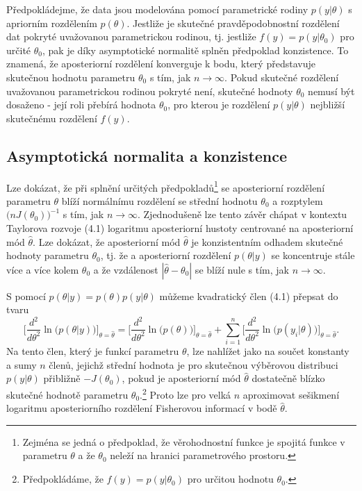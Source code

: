 Předpokládejme, že data jsou modelována pomocí parametrické rodiny $p(y|\theta)$ s apriorním rozdělením $p(\theta)$.  Jestliže je skutečné pravděpodobnostní rozdělení dat pokryté uvažovanou parametrickou rodinou, tj. jestliže $f(y) = p(y|\theta_0)$ pro určité $\theta_0$, pak je díky asymptotické normalitě splněn předpoklad konzistence. To znamená, že aposteriorní rozdělení konverguje k bodu, který představuje skutečnou hodnotu parametru $\theta_0$ s tím, jak $n \rightarrow \infty$. Pokud skutečné rozdělení uvažovanou parametrickou rodinou pokryté není, skutečné hodnoty $\theta_0$ nemusí být dosaženo - její roli přebírá hodnota $\theta_0$, pro kterou je rozdělení $p(y|\theta)$ nejbližší skutečnému rozdělení $f(y)$.

\subsection{Asymptotická normalita a konzistence}

Lze dokázat, že při splnění určitých předpokladů\footnote{Zejména se jedná o předpoklad, že věrohodnostní funkce je spojitá funkce v parametru $\theta$ a že $\theta_0$ neleží na hranici parametrového prostoru.} se aposteriorní rozdělení parametru $\theta$ blíží normálnímu rozdělení se střední hodnotu $\theta_0$ a rozptylem $\big(nJ(\theta_0)\big)^{-1}$ s tím, jak $n \rightarrow \infty$. Zjednodušeně lze tento závěr chápat v kontextu Taylorova rozvoje (4.1) logaritmu aposteriorní hustoty centrované na aposteriorní mód $\hat{\theta}$. Lze dokázat, že aposteriorní mód $\hat{\theta}$ je konzistentním odhadem skutečné hodnoty parametru $\theta_0$, tj. že a aposteriorní rozdělení $p(\theta|y)$ se koncentruje stále více a více kolem $\theta_0$ a že vzdálenost $|\hat{\theta} - \theta_0|$ se blíží nule s tím, jak $n \rightarrow \infty$.

S pomocí $p(\theta|y) = p(\theta) p(y|\theta)$ můžeme kvadratický člen (4.1) přepsat do tvaru
\begin{equation}
\Big[\frac{d^2}{d \theta^2} \ln\big(p(\theta|y)\big)\Big]_{\theta = \hat{\theta}} = \Big[\frac{d^2}{d \theta^2} \ln\big(p(\theta)\big)\Big]_{\theta = \hat{\theta}} + \sum_{i = 1}^n \Big[\frac{d^2}{d \theta^2} \ln\big(p(y_i|\theta)\big)\Big]_{\theta = \hat{\theta}}.
\end{equation}
Na tento člen, který je funkcí parametru $\theta$, lze nahlížet jako na součet konstanty a sumy $n$ členů, jejichž střední hodnota je pro skutečnou výběrovou distribuci $p(y|\theta)$ přibližně $-J(\theta_0)$, pokud je aposteriorní mód $\hat{\theta}$ dostatečně blízko skutečné hodnotě parametru $\theta_0$.\footnote{Předpokládáme, že $f(y) = p(y|\theta_0)$ pro určitou hodnotu $\theta_0$.} Proto lze pro velká $n$ aproximovat sešikmení logaritmu aposteriorního rozdělení Fisherovou informací v bodě $\hat{\theta}$.

